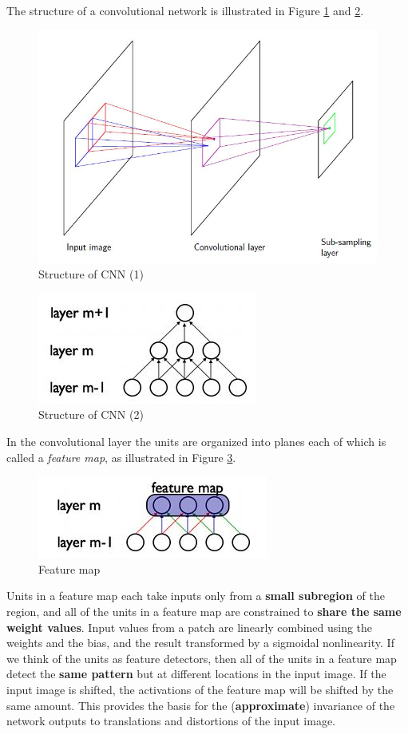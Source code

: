\documentclass[a4paper]{book}
\newcommand{\imp}[1]{\textit{#1}}
\begin{document}
The structure of a convolutional network is illustrated in Figure \ref{CNN1} and \ref{CNN2}.
\begin{figure}
	\centering
	\includegraphics[scale = 0.5]{CNN0}
	\caption{Structure of CNN (1)}\label{CNN1}
\end{figure}
\begin{figure}
	\centering
	\includegraphics[scale = 0.5]{CNN}
	\caption{Structure of CNN (2)}\label{CNN2}
\end{figure}

In the convolutional layer the units are organized into planes each of which is called a \imp{feature map}, as illustrated in Figure \ref{CNN3}. 
\begin{figure}
	\centering
	\includegraphics[scale = 0.5]{CNN2}
	\caption{Feature map}\label{CNN3}
\end{figure}
Units in a feature map each take inputs only from a \textbf{small subregion} of the region, and all of the units in a feature map are constrained to \textbf{share the same weight values}. Input values from a patch are linearly combined using the weights and the bias, and the result transformed by a sigmoidal nonlinearity. If we think of the units as feature detectors, then all of the units in a feature map detect the \textbf{same pattern} but at different locations in the input image. If the input image is shifted, the activations of the feature map will be shifted by the same amount. This provides the basis for the (\textbf{approximate}) invariance of the network outputs to translations and distortions of the input image.
\end{document}
